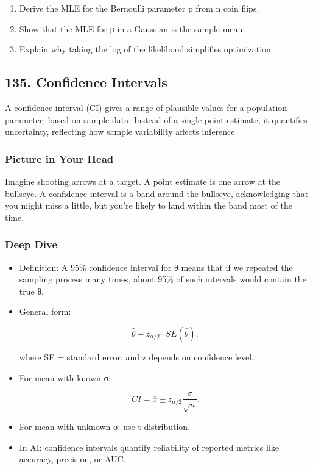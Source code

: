\documentclass[
  letterpaper,
  DIV=11,
  numbers=noendperiod]{scrreprt}
\providecommand{\tightlist}{%
  \setlength{\itemsep}{0pt}\setlength{\parskip}{0pt}}
\begin{document}
\begin{enumerate}
\def\labelenumi{\arabic{enumi}.}
\tightlist
\item
  Derive the MLE for the Bernoulli parameter p from n coin flips.
\item
  Show that the MLE for μ in a Gaussian is the sample mean.
\item
  Explain why taking the log of the likelihood simplifies optimization.
\end{enumerate}

\subsection{135. Confidence Intervals}\label{confidence-intervals}

A confidence interval (CI) gives a range of plausible values for a
population parameter, based on sample data. Instead of a single point
estimate, it quantifies uncertainty, reflecting how sample variability
affects inference.

\subsubsection{Picture in Your Head}\label{picture-in-your-head-134}

Imagine shooting arrows at a target. A point estimate is one arrow at
the bullseye. A confidence interval is a band around the bullseye,
acknowledging that you might miss a little, but you're likely to land
within the band most of the time.

\subsubsection{Deep Dive}\label{deep-dive-134}

\begin{itemize}
\item
  Definition: A 95\% confidence interval for θ means that if we repeated
  the sampling process many times, about 95\% of such intervals would
  contain the true θ.
\item
  General form:

  \[
  \hat{θ} \pm z_{\alpha/2} \cdot SE(\hat{θ}),
  \]

  where SE = standard error, and z depends on confidence level.
\item
  For mean with known σ:

  \[
  CI = \bar{x} \pm z_{\alpha/2} \frac{σ}{\sqrt{n}}.
  \]
\item
  For mean with unknown σ: use t-distribution.
\item
  In AI: confidence intervals quantify reliability of reported metrics
  like accuracy, precision, or AUC.
\end{itemize}
\end{document}
